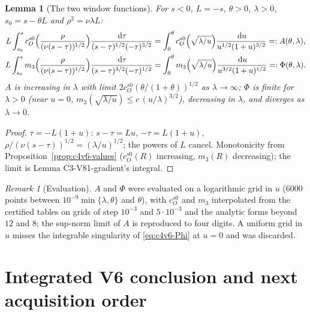 \documentclass[11pt]{article}
\newcommand{\dd}{\,\mathrm d}
\theoremstyle{plain}
\newtheorem{lemma}[theorem]{Lemma}
\theoremstyle{definition}
\theoremstyle{remark}
\newtheorem{remark}[theorem]{Remark}
\begin{document}
\begin{lemma}[The two window functions]
\label{lem:c4v6-window}
For \(s<0\), \(L=-s\), \(\theta>0\), \(\lambda>0\), \(s_0=s-\theta L\) and \(\rho^2=\nu\lambda L\):
\begin{align}
 L\int_{s_0}^s c_O^{s0}\Bigl(\frac\rho{(\nu(s-\tau))^{1/2}}\Bigr)\frac{\dd\tau}{(s-\tau)^{1/2}(-\tau)^{3/2}}
 &=\int_0^\theta c_O^{s0}\Bigl(\sqrt{\lambda/u}\Bigr)\frac{\dd u}{u^{1/2}(1+u)^{3/2}}=:A(\theta,\lambda),
 \label{eq:c4v6-A}\\
 L\int_{s_0}^s m_3\Bigl(\frac\rho{(\nu(s-\tau))^{1/2}}\Bigr)\frac{\dd\tau}{(s-\tau)^{3/2}(-\tau)^{1/2}}
 &=\int_0^\theta m_3\Bigl(\sqrt{\lambda/u}\Bigr)\frac{\dd u}{u^{3/2}(1+u)^{1/2}}=:\Phi(\theta,\lambda).
 \label{eq:c4v6-Phi}
\end{align}
\(A\) is increasing in \(\lambda\) with limit \(2c_O^{s0}(\theta/(1+\theta))^{1/2}\) as \(\lambda\to\infty\); \(\Phi\) is
finite for \(\lambda>0\) (near \(u=0\), \(m_3(\sqrt{\lambda/u})\le c\,(u/\lambda)^{3/2}\)), decreasing in \(\lambda\), and
diverges as \(\lambda\to0\).
\end{lemma}

\begin{proof}
\(\tau=-L(1+u)\): \(s-\tau=Lu\), \(-\tau=L(1+u)\), \(\rho/(\nu(s-\tau))^{1/2}=(\lambda/u)^{1/2}\); the powers of
\(L\) cancel.  Monotonicity from Proposition~\ref{prop:c4v6-values}
(\(c_O^{s0}(R)\) increasing, \(m_3(R)\) decreasing); the limit is Lemma
C3-V81-gradient's integral.
\end{proof}

\begin{remark}[Evaluation]
\label{rem:c4v6-evaluation}
\(A\) and \(\Phi\) were evaluated on a logarithmic grid in \(u\) (\(6000\) points
between \(10^{-9}\min\{\lambda,\theta\}\) and \(\theta\)), with \(c_O^{s0}\) and \(m_3\) interpolated from the
certified tables on grids of step \(10^{-3}\) and \(5\cdot10^{-3}\) and the analytic
forms beyond \(12\) and \(8\); the sup-norm limit of \(A\) is reproduced to four
digits.  A uniform grid in \(u\) misses the integrable singularity of
\eqref{eq:c4v6-Phi} at \(u=0\) and was discarded.
\end{remark}

\section{Integrated V6 conclusion and next acquisition order}
\label{sec:c4v6-conclusion}
\end{document}
